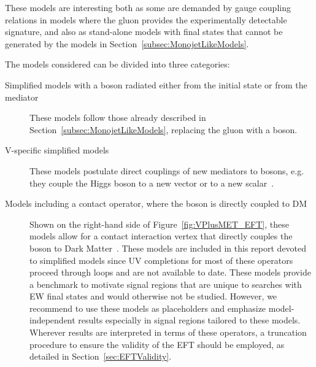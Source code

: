 

These models are interesting both as some are demanded by gauge coupling relations in models where the gluon provides
the experimentally detectable signature,
and also as stand-alone models with final states that cannot be generated by the models in
Section~\ref{subsec:MonojetLikeModels}.



%
The models considered can be divided into three categories:
\begin{description}
 \item[Simplified models with a boson radiated either from the initial state or from the mediator] These models follow those
 already described in Section~\ref{subsec:MonojetLikeModels}, replacing the gluon with a boson.
  \item[V-specific simplified models] These models postulate direct couplings of new mediators
 to bosons, e.g. they couple the Higgs boson to a new vector or to a new scalar~\cite{Carpenter:2013xra,Berlin:2014cfa}. 
 \item[Models including a contact operator, where the boson is directly coupled to DM]
 Shown on the right-hand side of Figure~\ref{fig:VPlusMET_EFT},
 these models allow for a contact interaction vertex that directly couples the boson to Dark Matter~\cite{Cotta:2012nj, Carpenter:2012rg, Crivellin:2015wva,Berlin:2014cfa}.
 These models are included in this report devoted to simplified models since 
 UV completions for most of these operators proceed through loops and are not available to date. 
 These models provide a benchmark to motivate signal regions that are unique to searches with
 EW final states and would otherwise not be studied. However, we recommend to use these models
 as placeholders and emphasize model-independent results especially in signal regions tailored to these models. 
 Wherever results are interpreted in terms of these operators, a truncation procedure
 to ensure the validity of the EFT should be employed, as detailed in Section~\ref{sec:EFTValidity}. 
\end{description}

